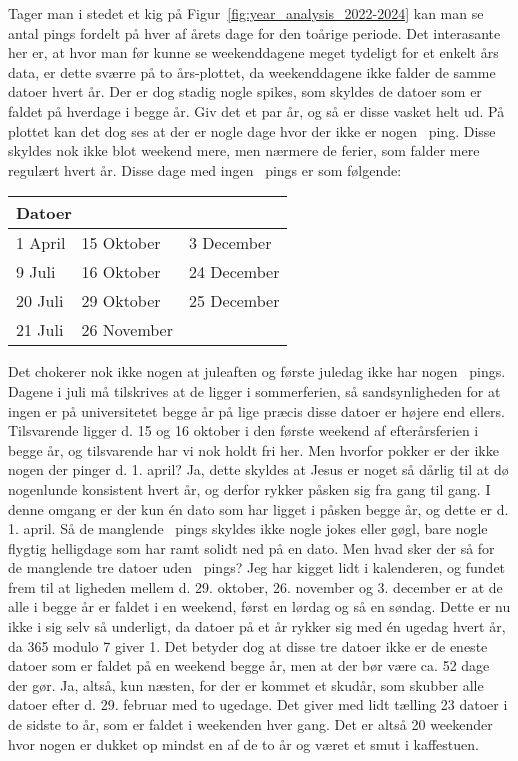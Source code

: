 \begin{article}
Tager man i stedet et kig på Figur~\ref{fig:year_analysis_2022-2024} kan man se antal pings fordelt på hver af årets dage for den toårige periode. Det interasante her er, at hvor man før kunne se weekenddagene meget tydeligt for et enkelt års data, er dette sværre på to års-plottet, da weekenddagene ikke falder de samme datoer hvert år. Der er dog stadig nogle spikes, som skyldes de datoer som er faldet på hverdage i begge år. Giv det et par år, og så er disse vasket helt ud.
På plottet kan det dog ses at der er nogle dage hvor der ikke er nogen \coffee\ ping. Disse skyldes nok ikke blot weekend mere, men nærmere de ferier, som falder mere regulært hvert år.
Disse dage med ingen \coffee\ pings er som følgende:
\begin{center}
	\begin{tabular}{l|l|l}
		\multicolumn{3}{l}{Datoer} \\ \hline
		\phantom{3}1 April & 15 Oktober & \phantom{3}3 December \\ 
		\phantom{3}9 Juli & 16 Oktober & 24 December \\ 
		20 Juli & 29 Oktober & 25 December \\
		21 Juli & 26 November & 
	\end{tabular}
\end{center}
Det chokerer nok ikke nogen at juleaften og første juledag ikke har nogen \coffee\ pings.
Dagene i juli må tilskrives at de ligger i sommerferien, så sandsynligheden for at ingen er på universitetet begge år på lige præcis disse datoer er højere end ellers.
Tilsvarende ligger d. 15 og 16 oktober i den første weekend af efterårsferien i begge år, og tilsvarende har vi nok holdt fri her.
Men hvorfor pokker er der ikke nogen der pinger d. 1. april? Ja, dette skyldes at Jesus er noget så dårlig til at dø nogenlunde konsistent hvert år, og derfor rykker påsken sig fra gang til gang. I denne omgang er der kun én dato som har ligget i påsken begge år, og dette er d. 1. april. Så de manglende \coffee\ pings skyldes ikke nogle jokes eller gøgl, bare nogle flygtig helligdage som har ramt solidt ned på en dato.
Men hvad sker der så for de manglende tre datoer uden \coffee\ pings?
Jeg har kigget lidt i kalenderen, og fundet frem til at ligheden mellem d. 29. oktober, 26. november og 3. december er at de alle i begge år er faldet i en weekend, først en lørdag og så en søndag. Dette er nu ikke i sig selv så underligt, da datoer på et år rykker sig med én ugedag hvert år, da 365 modulo 7 giver 1. Det betyder dog at disse tre datoer ikke er de eneste datoer som er faldet på en weekend begge år, men at der bør være ca. 52 dage der gør. Ja, altså, kun næsten, for der er kommet et skudår, som skubber alle datoer efter d. 29. februar med to ugedage. Det giver med lidt tælling 23 datoer i de sidste to år, som er faldet i weekenden hver gang. Det er altså 20 weekender hvor nogen er dukket op mindst en af de to år og været et smut i kaffestuen.


\end{article}
